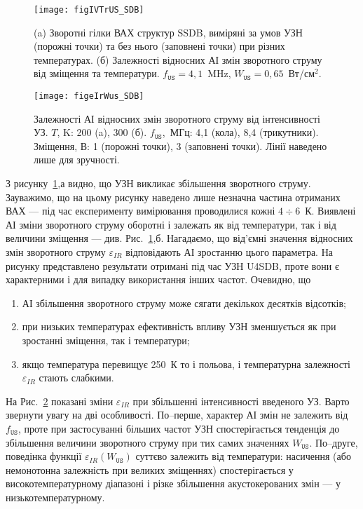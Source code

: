 \begin{figure}
\center
\texttt{[image: figIVTrUS\_SDB]}
\caption{\label{figIVTrUS_SDB}
(a) Зворотні гілки ВАХ структур SSDB, виміряні за умов УЗН (порожні точки) та без нього (заповнені точки) при різних температурах.
(б) Залежності відносних АІ змін зворотного струму від зміщення та температури.
$f_\mathtt{US}=4,1$~MHz, $W_\mathtt{US}=0,65$~Вт/см$^2$.
}%
\end{figure}

\begin{figure}
\center
\texttt{[image: figeIrWus\_SDB]}
\caption{\label{figeIrWus_SDB}
Залежності АІ відносних змін зворотного струму від інтенсивності УЗ.
$T$, K: 200 (a), 300 (б).
$f_\mathtt{US}$,~МГц: 4,1 (кола), 8,4 (трикутники).
Зміщення, В: 1 (порожні точки), 3 (заповнені точки).
Лінії наведено лише для зручності.
}%
\end{figure}

З рисунку~\ref{figIVTrUS_SDB},а видно, що УЗН викликає збільшення зворотного струму.
Зауважимо, що на цьому рисунку наведено лише незначна частина отриманих ВАХ ---
під час експерименту вимірювання проводилися кожні $4\div6$~К.
Виявлені АІ зміни зворотного струму оборотні і залежать як від температури, так і від величини зміщення ---
див. Рис.~\ref{figIVTrUS_SDB},б.
Нагадаємо, що від'ємні значення відносних змін зворотного струму $\varepsilon_{IR}$ відповідають
АІ зростанню цього параметра.
На рисунку представлено результати отримані під час УЗН U4SDB, проте вони є характерними і
для випадку використання інших частот.
Очевидно, що
\begin{enumerate}[label=\asbuk*),leftmargin=0em,itemindent=1.5em]
\item АІ збільшення зворотного струму може сягати декількох десятків відсотків;
\item при низьких температурах ефективність впливу УЗН зменшується як при зростанні зміщення, так і температури;
\item якщо температура перевищує 250~К то і польова, і температурна залежності $\varepsilon_{IR}$ стають слабкими.
\end{enumerate}

На Рис.~\ref{figeIrWus_SDB} показані зміни $\varepsilon_{IR}$ при збільшенні інтенсивності введеного УЗ.
Варто звернути увагу на дві особливості.
По--перше, характер АІ змін не залежить від $f_\mathtt{US}$,
проте при застосуванні більших частот УЗН спостерігається тенденція до збільшення величини зворотного струму
при тих самих значеннях $W_\mathtt{US}$.
По--друге, поведінка функції $\varepsilon_{IR}(W_\mathtt{US})$ суттєво залежить від температури:
насичення (або немонотонна залежність при великих зміщеннях) спостерігається у високотемпературному діапазоні
і різке збільшення акустокерованих змін --- у низькотемпературному.





